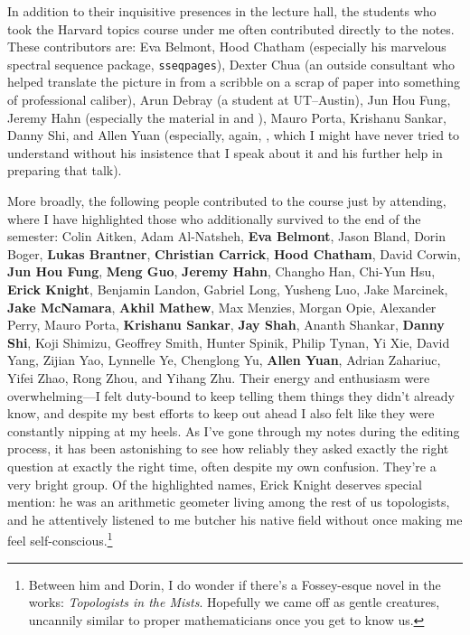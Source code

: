 In addition to their inquisitive presences in the lecture hall, the students who took the Harvard topics course under me often contributed directly to the notes.  These contributors are: Eva Belmont, Hood Chatham (especially his marvelous spectral sequence package, \texttt{sseqpages}), Dexter Chua (an outside consultant who helped translate the picture in  from a scribble on a scrap of paper into something of professional caliber), Arun Debray (a student at UT--Austin), Jun Hou Fung, Jeremy Hahn (especially the material in  and ), Mauro Porta, Krishanu Sankar, Danny Shi, and Allen Yuan (especially, again, , which I might have never tried to understand without his insistence that I speak about it and his further help in preparing that talk).

More broadly, the following people contributed to the course just by attending, where I have highlighted those who additionally survived to the end of the semester: Colin Aitken, Adam Al-Natsheh, \textbf{Eva Belmont}, Jason Bland, Dorin Boger, \textbf{Lukas Brantner}, \textbf{Christian Carrick}, \textbf{Hood Chatham}, David Corwin, \textbf{Jun Hou Fung}, \textbf{Meng Guo}, \textbf{Jeremy Hahn}, Changho Han, Chi-Yun Hsu, \textbf{Erick Knight}, Benjamin Landon, Gabriel Long, Yusheng Luo, Jake Marcinek, \textbf{Jake McNamara}, \textbf{Akhil Mathew}, Max Menzies, Morgan Opie, Alexander Perry, Mauro Porta, \textbf{Krishanu Sankar}, \textbf{Jay Shah}, Ananth Shankar, \textbf{Danny Shi}, Koji Shimizu, Geoffrey Smith, Hunter Spinik, Philip Tynan, Yi Xie, David Yang, Zijian Yao, Lynnelle Ye, Chenglong Yu, \textbf{Allen Yuan}, Adrian Zahariuc, Yifei Zhao, Rong Zhou, and Yihang Zhu.  Their energy and enthusiasm were overwhelming---I felt duty-bound to keep telling them things they didn't already know, and despite my best efforts to keep out ahead I also felt like they were constantly nipping at my heels.  As I've gone through my notes during the editing process, it has been astonishing to see how reliably they asked exactly the right question at exactly the right time, often despite my own confusion.  They're a very bright group.  Of the highlighted names, Erick Knight deserves special mention: he was an arithmetic geometer living among the rest of us topologists, and he attentively listened to me butcher his native field without once making me feel self-conscious.\footnote{Between him and Dorin, I do wonder if there's a Fossey-esque novel in the works: \textit{Topologists in the Mists}.  Hopefully we came off as gentle creatures, uncannily similar to proper mathematicians once you get to know us.}

